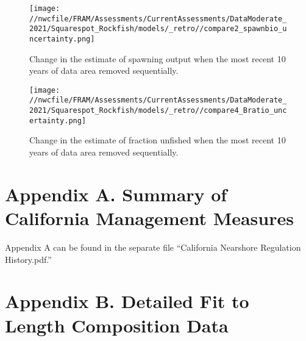 \documentclass[11pt,
  english,
  a4paper,
]{article}
\begin{document}
\begin{figure}
\centering
\texttt{[image: //nwcfile/FRAM/Assessments/CurrentAssessments/DataModerate\_2021/Squarespot\_Rockfish/models/\_retro//compare2\_spawnbio\_uncertainty.png]}
\caption{Change in the estimate of spawning output when the most recent 10 years of data area removed sequentially.\label{fig:retro-ssb}}
\end{figure}

\tagmcend\tagstructend


\begin{figure}
\centering
\texttt{[image: //nwcfile/FRAM/Assessments/CurrentAssessments/DataModerate\_2021/Squarespot\_Rockfish/models/\_retro//compare4\_Bratio\_uncertainty.png]}
\caption{Change in the estimate of fraction unfished when the most recent 10 years of data area removed sequentially.\label{fig:retro-depl}}
\end{figure}

\tagmcend\tagstructend

\newpage

\clearpage


\hypertarget{appendix-a.-summary-of-california-management-measures}{%
\section{Appendix A. Summary of California Management Measures}\label{appendix-a.-summary-of-california-management-measures}}

\leavevmode\tagmcend\tagstructend


Appendix A can be found in the separate file ``California Nearshore Regulation History.pdf.''

\leavevmode\tagmcend\tagstructend\par


\hypertarget{appendix-b.-detailed-fit-to-length-composition-data}{%
\section{Appendix B. Detailed Fit to Length Composition Data}\label{appendix-b.-detailed-fit-to-length-composition-data}}
\end{document}
